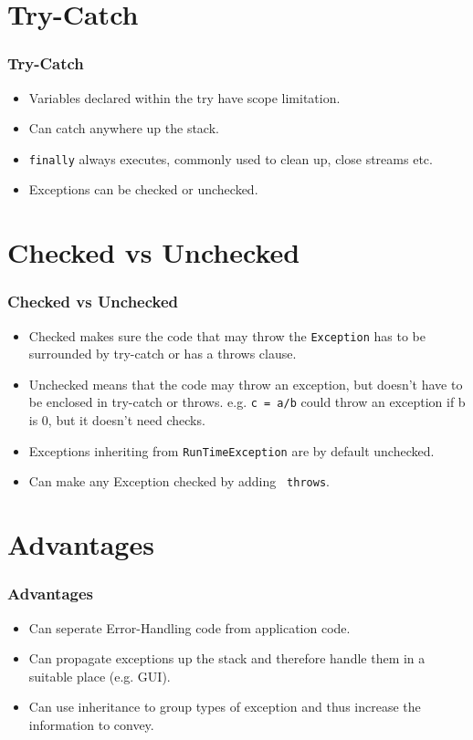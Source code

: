\documentclass{beamer}
\begin{document}
\section{Try-Catch}
\begin{frame}
\frametitle{Try-Catch}
\try
\begin{itemize}
\item Variables declared within the try have scope limitation.
\item Can catch anywhere up the stack.
\item \texttt{finally} always executes, commonly used to clean up, close streams etc.
\item Exceptions can be checked or unchecked.
\end{itemize}
\end{frame}
\section{Checked vs Unchecked}
\begin{frame}
\frametitle{Checked vs Unchecked}
\begin{itemize}
\item {\color{green} Checked} makes sure the code that may throw the \texttt{Exception} has to be surrounded by try-catch or has a throws clause. 
\item {\color{red} Unchecked} means that the code may throw an exception, but doesn't have to be enclosed in try-catch or throws. e.g. \texttt{c = a/b} could throw an exception if b is 0, but it doesn't need checks.
\item Exceptions inheriting from \texttt{RunTimeException} are by default {\color{red}unchecked}.
\item Can make any Exception {\color{green} checked} by adding \texttt{\color{purple} throws}.
\end{itemize}
\end{frame}
\section{Advantages}
\begin{frame}
\frametitle{Advantages}
\begin{itemize}
\item Can seperate Error-Handling code from application code.
\item Can propagate exceptions up the stack and therefore handle them in a suitable place (e.g. GUI).
\item Can use inheritance to group types of exception and thus increase the information to convey.
\end{itemize}
\end{frame}
\end{document}
